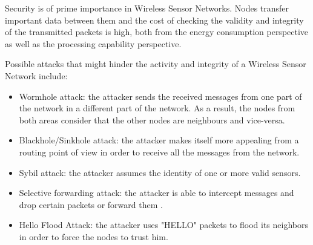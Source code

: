 Security is of prime importance in Wireless Sensor Networks. Nodes transfer important data between
them and the cost of checking the validity and integrity of the transmitted packets is high, both from 
the energy consumption perspective as well as the processing capability perspective.

Possible attacks that might hinder the activity and integrity of a Wireless Sensor Network include:
\begin{itemize}

\item Wormhole attack: the attacker sends the received messages from one part of the network in a different part of the network. As a result, the nodes from both areas consider that the other nodes are neighbours and vice-versa.
\item Blackhole/Sinkhole attack: the attacker makes itself more appealing from a routing point of view in order to receive all the messages from the network.
\item Sybil attack: the attacker assumes the identity of one or more valid sensors\cite{newsome2004sybil}.
\item Selective forwarding attack: the attacker is able to intercept messages and drop certain packets or forward them \cite{kaplantzis2007detecting}.
\item Hello Flood Attack: the attacker uses "HELLO" packets to flood its neighbors in order to force the nodes to trust him.

\end{itemize}

